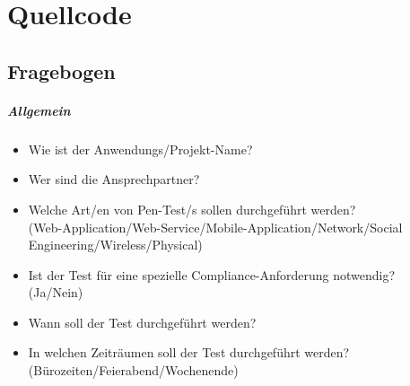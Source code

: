
\appendix
\chapter{Quellcode}

\section{Fragebogen}\label{ap:Fragebogen}
\paragraph{Allgemein}
\begin{itemize}
	\item Wie ist der Anwendungs/Projekt-Name?
	\item Wer sind die Ansprechpartner?
	\item Welche Art/en von Pen-Test/s sollen durchgeführt werden? \\
	(Web-Application/Web-Service/Mobile-Application/Network/Social Engineering/Wireless/Physical)
	\item Ist der Test für eine spezielle Compliance-Anforderung notwendig?\\
	(Ja/Nein)
	\item Wann soll der Test durchgeführt werden?
	\item In welchen Zeiträumen soll der Test durchgeführt werden?\\
	(Bürozeiten/Feierabend/Wochenende)
\end{itemize}

